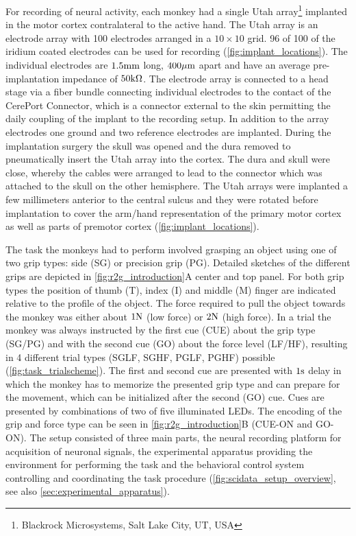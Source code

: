 For recording of neural activity, each monkey had a single Utah array\footnote{Blackrock Microsystems, Salt Lake City, UT, USA} implanted in the motor cortex contralateral to the active hand. The Utah array is an electrode array with 100 electrodes arranged in a $10\times10$ grid. 96 of 100 of the iridium coated electrodes can be used for recording (\cref{fig:implant_locations}). The individual electrodes are $1.5\textnormal{mm}$ long, $400\mu\textnormal{m}$ apart and have an average pre-implantation impedance of $50\textnormal{k}\Omega$. The electrode array is connected to a head stage via a fiber bundle connecting individual electrodes to the contact of the CerePort Connector, which is a connector external to the skin permitting the daily coupling of the implant to the recording setup. In addition to the array electrodes one ground and two reference electrodes are implanted. During the implantation surgery the skull was opened and the dura removed to pneumatically insert the Utah array into the cortex. The dura and skull were close, whereby the cables were arranged to lead to the connector which was attached to the skull on the other hemisphere. The Utah arrays were implanted a few millimeters anterior to the central sulcus and they were rotated before implantation to cover the arm/hand representation of the primary motor cortex as well as parts of premotor cortex (\cref{fig:implant_locations}).

The task the monkeys had to perform involved grasping an object using one of two grip types: side (SG) or precision grip (PG). Detailed sketches of the different grips are depicted in   \cref{fig:r2g_introduction}A center and top panel. For both grip types the position of thumb (T), index (I) and middle (M) finger are indicated relative to the profile of the object. The force required to pull the object towards the monkey was either about $1\textnormal{N}$ (low force) or $2\textnormal{N}$ (high force).  In a trial the monkey was always instructed by the first cue (CUE) about the grip type (SG/PG) and with the second cue (GO) about the force level (LF/HF), resulting in 4 different trial types (SGLF, SGHF, PGLF, PGHF) possible (\cref{fig:task_trialscheme}). The first and second cue are presented with $1\textnormal{s}$ delay in which the monkey has to memorize the presented grip type and can prepare for the movement, which can be initialized after the second (GO) cue. Cues are presented by combinations of two of five illuminated LEDs. The encoding of the grip and force type can be seen in \cref{fig:r2g_introduction}B (CUE-ON and GO-ON). The setup consisted of three main parts, the neural recording platform for acquisition of neuronal signals, the experimental apparatus providing the environment for performing the task and the behavioral control system controlling and coordinating the task procedure (\cref{fig:scidata_setup_overview}, see also \cref{sec:experimental_apparatus}).

